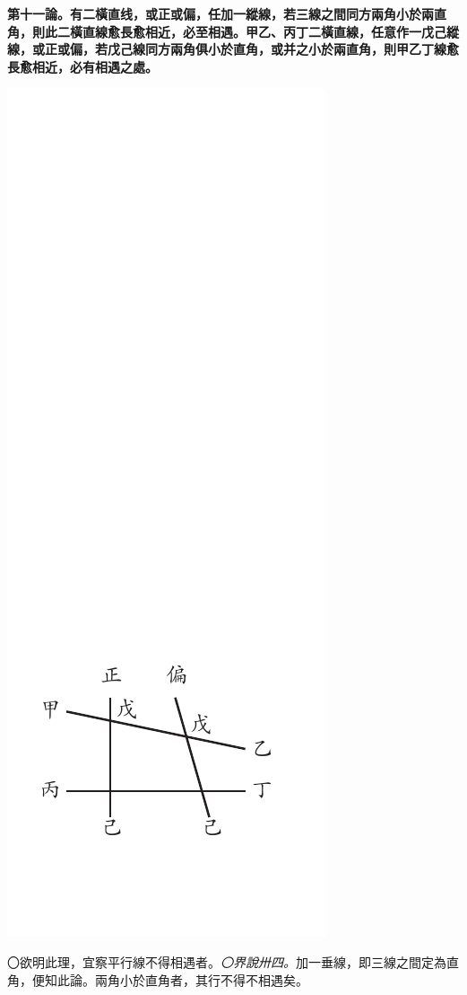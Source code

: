 \documentclass[12pt,b5paper,landscape]{article}
\newcommand{\ccom}[1]{{\footnotesize \emph{〇#1}}}
\newcommand{\bcom}[1]{〇#1}
\newcommand{\cthm}[1]{{
\vspace{8pt}

\bfseries #1}}
\begin{document}
\begin{multicols}{2}
\cthm{第十一論。有二橫直线，或正或偏，任加一縱線，若三線之間同方兩角小於兩直角，則此二橫直線愈長愈相近，必至相遇。甲乙、丙丁二橫直線，任意作一戊己縱線，或正或偏，若戊己線同方兩角俱小於直角，或并之小於兩直角，則甲乙丁線愈長愈相近，必有相遇之處。}
\begin{center}
\includegraphics[angle=90]{eu29}
\end{center}
\bcom{欲明此理，宜察平行線不得相遇者。\ccom{界說卅四。}加一垂線，即三線之間定為直角，便知此論。兩角小於直角者，其行不得不相遇矣。}


\end{multicols}
\end{document}
